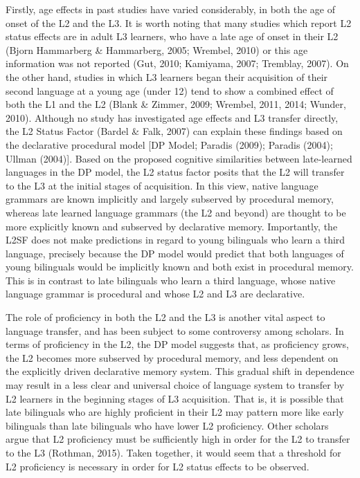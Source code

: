 \documentclass[
  man]{apa6}
\begin{document}
Firstly, age effects in past studies have varied considerably, in both the age of onset of the L2 and the L3.
It is worth noting that many studies which report L2 status effects are in adult L3 learners, who have a late age of onset in their L2 (Bjorn Hammarberg \& Hammarberg, 2005; Wrembel, 2010) or this age information was not reported (Gut, 2010; Kamiyama, 2007; Tremblay, 2007).
On the other hand, studies in which L3 learners began their acquisition of their second language at a young age (under 12) tend to show a combined effect of both the L1 and the L2 (Blank \& Zimmer, 2009; Wrembel, 2011, 2014; Wunder, 2010).
Although no study has investigated age effects and L3 transfer directly, the L2 Status Factor (Bardel \& Falk, 2007) can explain these findings based on the declarative procedural model {[}DP Model; Paradis (2009); Paradis (2004); Ullman (2004){]}.
Based on the proposed cognitive similarities between late-learned languages in the DP model, the L2 status factor posits that the L2 will transfer to the L3 at the initial stages of acquisition.
In this view, native language grammars are known implicitly and largely subserved by procedural memory, whereas late learned language grammars (the L2 and beyond) are thought to be more explicitly known and subserved by declarative memory.
Importantly, the L2SF does not make predictions in regard to young bilinguals who learn a third language, precisely because the DP model would predict that both languages of young bilinguals would be implicitly known and both exist in procedural memory.
This is in contrast to late bilinguals who learn a third language, whose native language grammar is procedural and whose L2 and L3 are declarative.

The role of proficiency in both the L2 and the L3 is another vital aspect to language transfer, and has been subject to some controversy among scholars.
In terms of proficiency in the L2, the DP model suggests that, as proficiency grows, the L2 becomes more subserved by procedural memory, and less dependent on the explicitly driven declarative memory system.
This gradual shift in dependence may result in a less clear and universal choice of language system to transfer by L2 learners in the beginning stages of L3 acquisition.
That is, it is possible that late bilinguals who are highly proficient in their L2 may pattern more like early bilinguals than late bilinguals who have lower L2 proficiency.
Other scholars argue that L2 proficiency must be sufficiently high in order for the L2 to transfer to the L3 (Rothman, 2015).
Taken together, it would seem that a threshold for L2 proficiency is necessary in order for L2 status effects to be observed.
\end{document}
